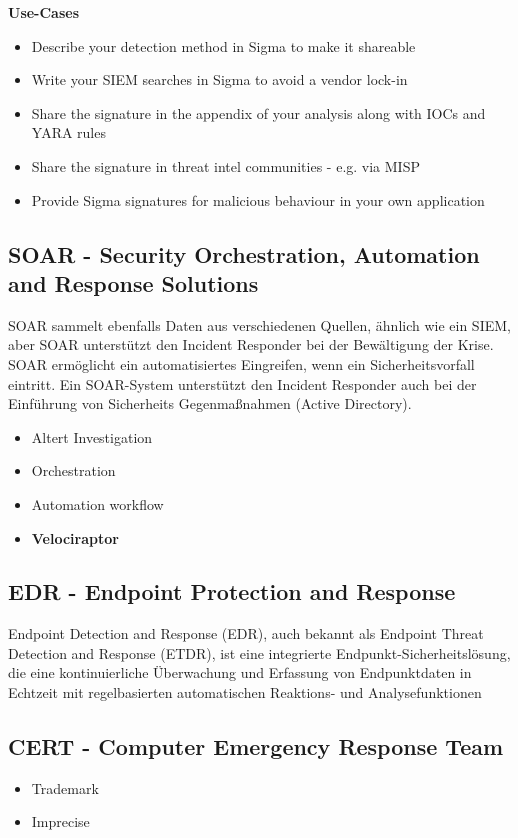 \textbf{Use-Cases}
\begin{itemize}
    \item Describe your detection method in Sigma to make it shareable
    \item Write your SIEM searches in Sigma to avoid a vendor lock-in
    \item Share the signature in the appendix of your analysis along with IOCs and YARA rules
    \item Share the signature in threat intel communities - e.g. via MISP
    \item Provide Sigma signatures for malicious behaviour in your own application
\end{itemize}

\subsection{SOAR - Security Orchestration, Automation and Response Solutions}
SOAR sammelt ebenfalls Daten aus verschiedenen Quellen, ähnlich wie ein SIEM, aber SOAR unterstützt den Incident Responder bei der Bewältigung der Krise. SOAR ermöglicht ein automatisiertes Eingreifen, wenn ein Sicherheitsvorfall eintritt. Ein SOAR-System unterstützt den Incident Responder auch bei der Einführung von Sicherheits Gegenmaßnahmen (Active Directory).\\

\begin{itemize}
    \item Altert Investigation
    \item Orchestration
    \item Automation workflow
    \item \textbf{Velociraptor}
\end{itemize}

\subsection{EDR - Endpoint Protection and Response}
Endpoint Detection and Response (EDR), auch bekannt als Endpoint Threat Detection and Response (ETDR), ist eine integrierte Endpunkt-Sicherheitslösung, die eine kontinuierliche Überwachung und Erfassung von Endpunktdaten in Echtzeit mit regelbasierten automatischen Reaktions- und Analysefunktionen

\newpage

\subsection{CERT - Computer Emergency Response Team}
\begin{itemize}
    \item Trademark
    \item Imprecise
\end{itemize}

